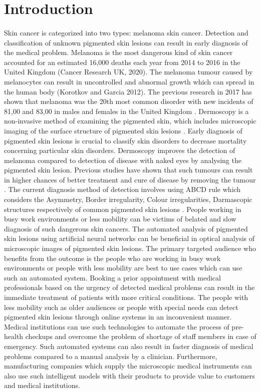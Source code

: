 \section{Introduction}
\paragraph*{}
Skin cancer is categorized into two types: melanoma skin cancer. 
Detection and classification of unknown pigmented skin lesions can result in early diagnosis of the medical problem. Melanoma is the most dangerous kind of skin cancer accounted for an estimated 16,000 deaths each year from 2014 to 2016 in the United Kingdom (Cancer Research UK, 2020). The melanoma tumour caused by melanocytes can result in uncontrolled and abnormal growth which can spread in the human body (Korotkov and Garcia 2012).
The previous research in 2017 has shown that melanoma was the 20th most common disorder with new incidents of 81,00 and 83,00 in males and females in the United Kingdom \citep*{KOROTKOV201269}.
Dermoscopy is a non-invasive method of examining the pigmented skin, which includes microscopic imaging of the surface structure of pigmented skin lesions \citep*{KOROTKOV201269}.
Early diagnosis of pigmented skin lesions is crucial to classify skin disorders to decrease mortality concerning particular skin disorders. Dermoscopy improves the detection of melanoma compared to detection of disease with naked eyes by analysing the pigmented skin lesion. Previous studies have shown that such tumours can result in higher chances of better treatment and cure of disease by removing the tumour \citep*{CELEBI2007362}.
The current diagnosis method of detection involves using ABCD rule which considers the Asymmetry, Border irregularity, Colour irregularities, Darmascopic structures respectively of common pigmented skin lesions \citep*{LOESCHER2013170}.
People working in busy work environments or less mobility can be victims of belated and slow diagnosis of such dangerous skin cancers.
The automated analysis of pigmented skin lesions using artificial neural networks can be beneficial in optical analysis of microscopic images of pigmented skin lesions. 
The primary targeted audience who benefits from the outcome is the people who are working in busy work environments or people with less mobility are best to use cases which can use such an automated system. Booking a prior appointment with medical professionals based on the urgency of detected medical problems can result in the immediate treatment of patients with more critical conditions. The people with less mobility such as older audiences or people with special needs can detect pigmented skin lesions through online systems in an inconvenient manner. Medical institutions can use such technologies to automate the process of pre-health checkups and overcome the problem of shortage of staff members in case of emergency. Such automated systems can also result in faster diagnosis of medical problems compared to a manual analysis by a clinician. 
Furthermore, manufacturing companies which supply the microscopic medical instruments can also use such intelligent models with their products to provide value to customers and medical institutions.


